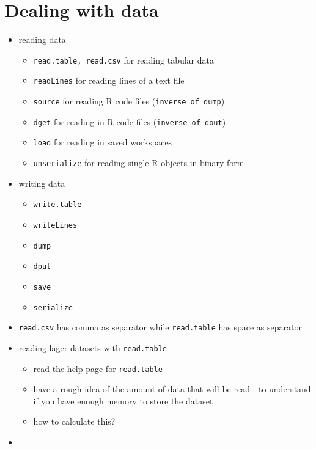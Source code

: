 \documentclass[11pt,fancy]{elegantbook}
\begin{document}
\section{Dealing with data}
\begin{itemize}
    \item reading data
          \begin{itemize}
              \item \texttt{read.table, read.csv} for reading tabular data
              \item \texttt{readLines} for reading lines of a text file
              \item \texttt{source} for reading R code files (\texttt{inverse of dump})
              \item \texttt{dget} for reading in R code files (\texttt{inverse of dout})
              \item \texttt{load} for reading in saved workspaces
              \item \texttt{unserialize} for reading single R objects in binary form
          \end{itemize}
    \item writing data
          \begin{itemize}
              \item \texttt{write.table}
              \item \texttt{writeLines}
              \item \texttt{dump}
              \item \texttt{dput}
              \item \texttt{save}
              \item \texttt{serialize }
          \end{itemize}
    \item \texttt{read.csv} has comma as separator while \texttt{read.table} has space as separator
    \item reading lager datasets with \texttt{read.table}
          \begin{itemize}
              \item read the help page for \texttt{read.table}
              \item have a rough idea of the amount of data that will be read - to understand if you have enough memory to store the dataset
              \item how to calculate this?
          \end{itemize}
    \item

\end{itemize}

\nocite{elegantbook}
\printbibliography
\end{document}
